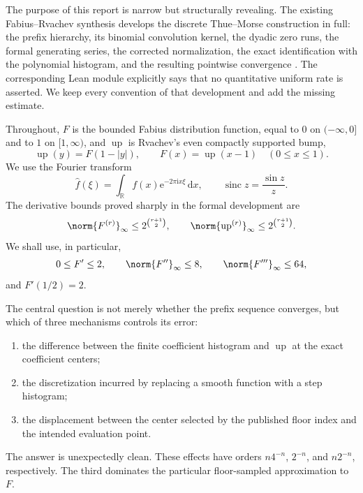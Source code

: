 \documentclass[11pt,oneside]{article}
\theoremstyle{definition}
\theoremstyle{remark}
\newcommand{\R}{\mathbb R}
\newcommand{\Up}{\operatorname{up}}
\newcommand{\sinc}{\operatorname{sinc}}
\newcommand{\e}{\mathrm e}
\newcommand{\ii}{\mathrm i}
\newcommand{\dd}{\,\mathrm d}
\begin{document}
The purpose of this report is narrow but structurally revealing.  The existing
Fabius--Rvachev synthesis develops the discrete Thue--Morse construction in full:
the prefix hierarchy, its binomial convolution kernel, the dyadic zero runs, the
formal generating series, the corrected normalization, the exact identification
with the polynomial histogram, and the resulting pointwise convergence
\cite{tmrate:proveit,tmrate:synthesis}.  The corresponding Lean module
 explicitly says that no quantitative uniform
rate is asserted.  We keep every convention of that development and add the
missing estimate.

Throughout, $F$ is the bounded Fabius distribution function, equal to $0$ on
$(-\infty,0]$ and to $1$ on $[1,\infty)$, and $\Up$ is Rvachev's even compactly
supported bump,
\begin{equation}
 \Up(y)=F(1-|y|),\qquad
 F(x)=\Up(x-1)\quad(0\le x\le1).                 \label{tmrate:eq:fold}
\end{equation}
We use the Fourier transform
\begin{equation}
 \widehat f(\xi)=\int_{\R}f(x)\e^{-2\pi\ii x\xi}\dd x,
 \qquad \sinc z=\frac{\sin z}{z}.               \label{tmrate:eq:fourier-convention}
\end{equation}
The derivative bounds proved sharply in the formal development are
\begin{equation}
 \norm{F^{(r)}}_\infty\le 2^{\binom{r+1}{2}},
 \qquad
 \norm{\Up^{(r)}}_\infty\le 2^{\binom{r+1}{2}}.  \label{tmrate:eq:derivative-bounds}
\end{equation}
We shall use, in particular,
\begin{equation}
 0\le F'\le2,
 \qquad \norm{F''}_\infty\le8,
 \qquad \norm{F'''}_\infty\le64,                \label{tmrate:eq:low-derivative-bounds}
\end{equation}
and $F'(1/2)=2$.

The central question is not merely whether the prefix sequence converges, but
which of three mechanisms controls its error:
\begin{enumerate}
\item the difference between the finite coefficient histogram and $\Up$ at the
      exact coefficient centers;
\item the discretization incurred by replacing a smooth function with a step
      histogram;
\item the displacement between the center selected by the published floor index
      and the intended evaluation point.
\end{enumerate}
The answer is unexpectedly clean.  These effects have orders
$ n4^{-n}$, $2^{-n}$, and $n2^{-n}$, respectively.  The third dominates the
particular floor-sampled approximation to $F$.
\end{document}
